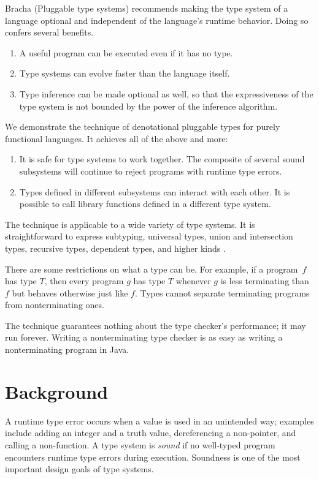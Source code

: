 \documentclass{amsart}
\def\thingsExpressibleInMpsModel{%
subtyping, universal types, union and intersection types,
recursive types, dependent types, and higher kinds%
}
\begin{document}
Bracha (Pluggable type systems) recommends making the type system
of a language optional and independent of the language's runtime
behavior. Doing so confers several benefits.
\begin{enumerate}
\item A useful program can be executed even if it has no type.
\item Type systems can evolve faster than the language itself.
\item Type inference can be made optional as well, so that the
expressiveness of the type system is not bounded by the power of
the inference algorithm.
\end{enumerate}
We demonstrate the technique of denotational pluggable types for
purely functional languages. It achieves all of the above and
more:
\begin{enumerate}\setcounter{enumi}3
\item It is safe for type systems to work together. The composite
of several sound subsystems will continue to reject programs with
runtime type errors.
\item Types defined in different subsystems can interact with
each other. It is possible to call library functions defined
in a different type system.
\end{enumerate}
The technique is applicable to a wide variety of type systems. It
is straightforward to express \thingsExpressibleInMpsModel.

There are some restrictions on what a type can be. For example,
if a program~$f$ has type $T$, then every program $g$ has type
$T$ whenever $g$ is less terminating than $f$ but behaves
otherwise just like $f$. Types cannot separate terminating
programs from nonterminating ones.

The technique guarantees nothing about the type checker's
performance; it may run forever. Writing a nonterminating type
checker is as easy as writing a nonterminating program in Java.

\section{Background}

A runtime type error occurs when a value is used in an unintended
way; examples include adding an integer and a truth value,
dereferencing a non-pointer, and calling a non-function. A type
system is \emph{sound} if no well-typed program encounters
runtime type errors during execution. Soundness is one of the
most important design goals of type systems.
\end{document}
